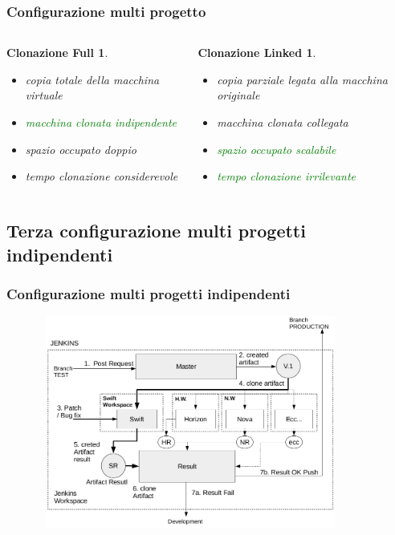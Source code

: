 \documentclass{beamer}
\theoremstyle{definition}
\theoremstyle{plain}
\newtheorem{clonazione_full}{Clonazione Full}
\newtheorem{clonazione_linked}{Clonazione Linked}
\begin{document}
\begin{frame}
\frametitle{Configurazione multi progetto}
\begin{columns}
\begin{clonazione_full}
\begin{itemize}
\item
copia totale della macchina virtuale
\item
\textcolor{green}{macchina clonata indipendente}
\item
spazio occupato doppio
\item
tempo clonazione considerevole
\end{itemize}
\end{clonazione_full}
\begin{clonazione_linked}
\begin{itemize}
\item
copia parziale legata alla macchina originale
\item
macchina clonata collegata 
\item
\textcolor{green}{spazio occupato scalabile}
\item
\textcolor{green}{tempo clonazione irrilevante}
\end{itemize}
\end{clonazione_linked}
\end{columns}
\end{frame}

\subsection{Terza configurazione multi progetti indipendenti}
\begin{frame}
\frametitle{Configurazione multi progetti indipendenti}
\begin{figure}[!h]
	\begin{center}
\includegraphics[width=10cm, height=7cm]{conf3.png}
\end{center}
\end{figure}
\end{frame}
\end{document}
